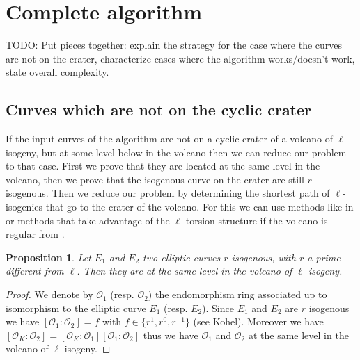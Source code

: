 \documentclass{lms}
\newcommand{\todo}[1]{{\color{red}TODO: #1}}
\newtheorem{prop}[thm]{Proposition}
\begin{document}
\section{Complete algorithm}
\label{sec:complete-algorithm}
\todo{Put pieces together: explain the strategy for the case where the
  curves are not on the crater, characterize cases where the algorithm
  works/doesn't work, state overall complexity.}
  
  \subsection{Curves which are not on the cyclic crater}

If the input curves of the algorithm are not on a cyclic crater of a volcano of $\ell$-isogeny, but at some level below in the volcano then we can reduce our problem to that case. First we prove that they are located at the same level in the volcano, then we prove that the isogenous curve on the crater are still $r$ isogenous. Then we reduce our problem by determining the shortest path of $\ell$-isogenies that go to the crater of the volcano. For this we can use methods like in \cite{DBLP:journals/amc/MiretMSTV06} or methods that take advantage of the $\ell$-torsion structure if the volcano is regular from \cite{DBLP:journals/moc/MiretMRV05}.
  
\begin{prop}
Let $E_1$ and $E_2$ two elliptic curves $r$-isogenous, with $r$ a prime different from $\ell$. Then they are at the same level in the volcano of $\ell$ isogeny.
\end{prop}

\begin{proof}
We denote by $\mathcal{O}_1$ (resp. $\mathcal{O}_2$) the endomorphism ring associated up to isomorphism to the elliptic curve $E_1$ (resp. $E_2$). Since $E_1$ and $E_2$ are $r$ isogenous we have $[\mathcal{O}_1:\mathcal{O}_2]=f$ with $f \in \{r^1,r^0,r^{-1}\}$ (see Kohel). Moreover we have $[\mathcal{O}_K:\mathcal{O}_2]=[\mathcal{O}_K:\mathcal{O}_1][\mathcal{O}_1:\mathcal{O}_2]$ thus we have $\mathcal{O}_1$ and $\mathcal{O}_2$ at the same level in the volcano of $\ell$ isogeny.
\end{proof}  
\end{document}

